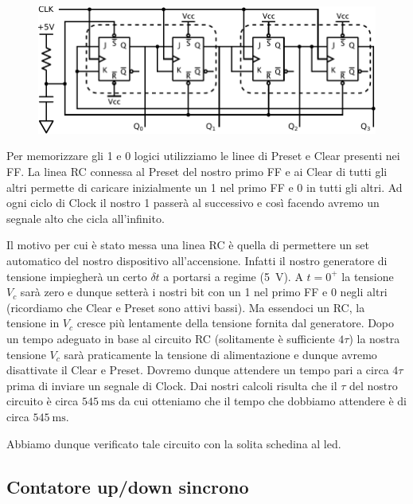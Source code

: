 \begin{figure}[htpc]
\centering
	\includegraphics[width=.85\textwidth]{../E12/latex/shift_register.pdf}
	\caption{}
	\label{cir12:shift}
\end{figure}

Per memorizzare gli 1 e 0 logici utilizziamo le linee di Preset e Clear presenti nei FF. La linea RC connessa al Preset del nostro primo FF e ai Clear di tutti gli altri permette di caricare inizialmente un 1 nel primo FF e 0 in tutti gli altri. Ad ogni ciclo di Clock il nostro 1 passerà al successivo e così facendo avremo un segnale alto che cicla all'infinito.

Il motivo per cui è stato messa una linea RC è quella di permettere un set automatico del nostro dispositivo all'accensione. Infatti il nostro generatore di tensione impiegherà un certo $\delta t$ a portarsi a regime (\SI{5}{\volt}). A $t=0^+$ la tensione $V_c$ sarà zero e dunque setterà i nostri bit con un 1 nel primo FF e 0 negli altri (ricordiamo che Clear e Preset sono attivi bassi). Ma essendoci un RC, la tensione in $V_c$ cresce più lentamente della tensione fornita dal generatore. Dopo un tempo adeguato in base al circuito RC (solitamente è sufficiente $4\tau$) la nostra tensione $V_c$ sarà praticamente la tensione di alimentazione e dunque avremo disattivate il Clear e Preset. Dovremo dunque attendere un tempo pari a circa $4\tau$ prima di inviare un segnale di Clock. Dai nostri calcoli risulta che il $\tau$ del nostro circuito è circa $\SI{545}{\milli\second}$ da cui otteniamo che il tempo che dobbiamo attendere è di circa $\SI{545}{\milli\second}$.

Abbiamo dunque verificato tale circuito con la solita schedina al led. 

\subsection{Contatore up/down sincrono}

